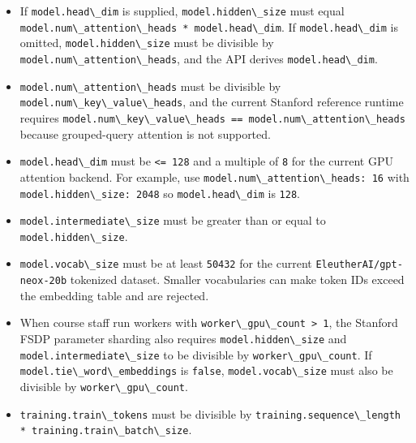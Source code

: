 \documentclass[
]{article}
\newcommand{\passthrough}[1]{#1}
\providecommand{\tightlist}{%
  \setlength{\itemsep}{0pt}\setlength{\parskip}{0pt}}
\begin{document}
\begin{itemize}
\tightlist
\item
  If \passthrough{\lstinline!model.head\_dim!} is supplied,
  \passthrough{\lstinline!model.hidden\_size!} must equal
  \passthrough{\lstinline!model.num\_attention\_heads * model.head\_dim!}.
  If \passthrough{\lstinline!model.head\_dim!} is omitted,
  \passthrough{\lstinline!model.hidden\_size!} must be divisible by
  \passthrough{\lstinline!model.num\_attention\_heads!}, and the API
  derives \passthrough{\lstinline!model.head\_dim!}.
\item
  \passthrough{\lstinline!model.num\_attention\_heads!} must be
  divisible by \passthrough{\lstinline!model.num\_key\_value\_heads!},
  and the current Stanford reference runtime requires
  \passthrough{\lstinline!model.num\_key\_value\_heads == model.num\_attention\_heads!}
  because grouped-query attention is not supported.
\item
  \passthrough{\lstinline!model.head\_dim!} must be
  \passthrough{\lstinline!<= 128!} and a multiple of
  \passthrough{\lstinline!8!} for the current GPU attention backend. For
  example, use \passthrough{\lstinline!model.num\_attention\_heads: 16!}
  with \passthrough{\lstinline!model.hidden\_size: 2048!} so
  \passthrough{\lstinline!model.head\_dim!} is
  \passthrough{\lstinline!128!}.
\item
  \passthrough{\lstinline!model.intermediate\_size!} must be greater
  than or equal to \passthrough{\lstinline!model.hidden\_size!}.
\item
  \passthrough{\lstinline!model.vocab\_size!} must be at least
  \passthrough{\lstinline!50432!} for the current
  \passthrough{\lstinline!EleutherAI/gpt-neox-20b!} tokenized dataset.
  Smaller vocabularies can make token IDs exceed the embedding table and
  are rejected.
\item
  When course staff run workers with
  \passthrough{\lstinline!worker\_gpu\_count > 1!}, the Stanford FSDP
  parameter sharding also requires
  \passthrough{\lstinline!model.hidden\_size!} and
  \passthrough{\lstinline!model.intermediate\_size!} to be divisible by
  \passthrough{\lstinline!worker\_gpu\_count!}. If
  \passthrough{\lstinline!model.tie\_word\_embeddings!} is
  \passthrough{\lstinline!false!},
  \passthrough{\lstinline!model.vocab\_size!} must also be divisible by
  \passthrough{\lstinline!worker\_gpu\_count!}.
\item
  \passthrough{\lstinline!training.train\_tokens!} must be divisible by
  \passthrough{\lstinline!training.sequence\_length * training.train\_batch\_size!}.

\end{itemize}
\end{document}

